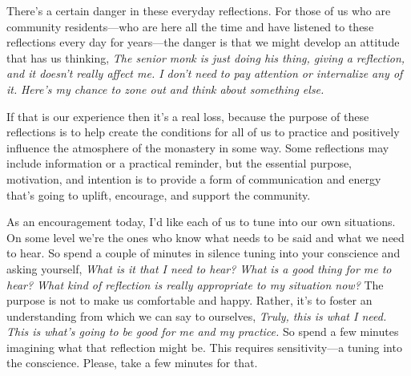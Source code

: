 
There's a certain danger in these everyday reflections. For those of us 
who are community residents---who are here all the time and have 
listened to these reflections every day for years---the danger is that 
we might develop an attitude that has us thinking, \emph{The senior 
monk is just doing his thing, giving a reflection, and it doesn't 
really affect me. I don't need to pay attention or internalize any of 
it.} \emph{Here's my chance to zone out and think about something else.}

If that is our experience then it's a real loss, because the purpose of 
these reflections is to help create the conditions for all of us to 
practice and positively influence the atmosphere of the monastery in 
some way. Some reflections may include information or a practical 
reminder, but the essential purpose, motivation, and intention is to 
provide a form of communication and energy that's going to uplift, 
encourage, and support the community.

As an encouragement today, I'd like each of us to tune into our own 
situations. On some level we're the ones who know what needs to be said 
and what we need to hear. So spend a couple of minutes in silence 
tuning into your conscience and asking yourself, \emph{What is it that 
I need to hear? What is a good thing for me to hear? What kind of 
reflection is really appropriate to my situation now?} The purpose is 
not to make us comfortable and happy. Rather, it's to foster an 
understanding from which we can say to ourselves, \emph{Truly, this is 
what I need. This is what's going to be good for me and my practice.} 
So spend a few minutes imagining what that reflection might be. This 
requires sensitivity---a tuning into the conscience. Please, take a few 
minutes for that.

